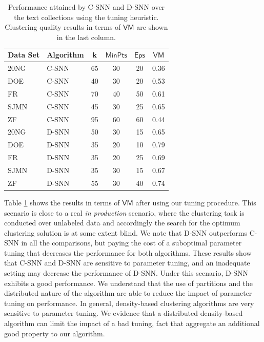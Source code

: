 \documentclass[smallextended]{svjour3}       %
\begin{document}

\begin{table}[!htbp]
\centering
\begin{tabular}{|l|l|c|c|c|c|}
\hline
Data Set  &  Algorithm &  k  & $\mathsf{MinPts}$ & $\mathsf{Eps}$ & $\mathsf{VM}$ \\
\hline \hline
20NG      &  C-SNN     &  65 &  30  &  20  &  0.36  \\  
DOE       &  C-SNN     &  40 &  30  &  20  &  0.53  \\
FR        &  C-SNN     &  70 &  40  &  50  &  0.61  \\
SJMN      &  C-SNN     &  45 &  30  &  25  &  0.65  \\
ZF        &  C-SNN     &  95 &  60  &  60  &  0.44  \\
20NG      &  D-SNN     &  50 &  30  &  15  &  0.65  \\
DOE       &  D-SNN     &  35 &  20  &  10  &  0.79  \\
FR        &  D-SNN     &  35 &  20  &  25  &  0.69  \\
SJMN      &  D-SNN     &  35 &  30  &  15  &  0.67  \\
ZF        &  D-SNN     &  55 &  30  &  40  &  0.74  \\
\hline
\end{tabular}
\caption{Performance attained by C-SNN and D-SNN over the text collections using the tuning heuristic. Clustering quality results in terms of $\textsf{VM}$ are shown in the last column.}
\label{table:tune}
\end{table}

Table \ref{table:tune} shows the results in terms of $\mathsf{VM}$ after using our tuning procedure. This scenario is close to a real \textit{in production} scenario, where the clustering task is conducted over unlabeled data and accordingly the search for the optimum clustering solution is at some extent blind. We note that D-SNN outperforms C-SNN in all the comparisons, but paying the cost of a suboptimal parameter tuning that decreases the performance for both algorithms. These results show that C-SNN and D-SNN are sensitive to parameter tuning, and an inadequate setting may decrease the performance of D-SNN. Under this scenario, D-SNN exhibits a good performance. We understand that the use of partitions and the distributed nature of the algorithm are able to reduce the impact of parameter tuning on performance. In general, density-based clustering algorithms are very sensitive to parameter tuning. We evidence that a distributed density-based algorithm can limit the impact of a bad tuning, fact that aggregate an additional good property to our algorithm. 
\end{document}
